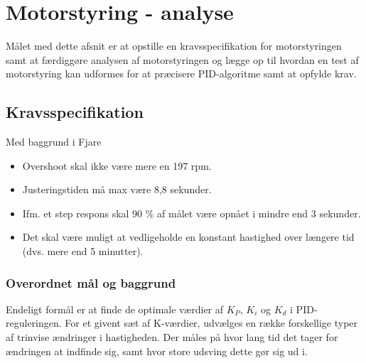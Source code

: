 \section{Motorstyring - analyse}
\label{sec:motorstyring-analyse}
Målet med dette afsnit er at opstille en kravsspecifikation for motorstyringen samt at færdiggøre analysen af motorstyringen og lægge op til hvordan en test af motorstyring kan udformes for at præcisere PID-algoritme samt at opfylde krav.



\lstset{escapechar=@,style=customc}

\subsection{Kravsspecifikation}
\label{sec:kravsspecifikation}
Med baggrund i Fjare\cite{pid1}
\begin{itemize}
\item Overshoot skal ikke være mere en 197 rpm.
\item Justeringstiden må max være 8,8 sekunder.
\item Ifm. et step respons skal 90 \% af målet være opnået i mindre end 3 sekunder.
\item Det skal være muligt at vedligeholde en konstant hastighed over længere tid (dvs. mere end 5 minutter).
\end{itemize}

\subsubsection{Overordnet mål og baggrund}
\label{sec:overordnet-mal}

Endeligt formål er at finde de optimale værdier af $K_P$, $K_i$ og $K_d$ i PID-reguleringen. For et givent sæt af K-værdier, udvælges en række forskellige typer af trinvise ændringer i hastigheden. Der måles på hvor lang tid det tager for ændringen at indfinde sig, samt hvor store udsving dette gør sig ud i.

